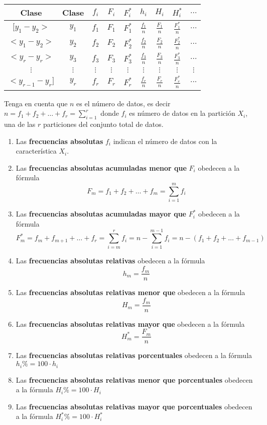 \documentclass[10pt,]{krantz}
\theoremstyle{definition}
\theoremstyle{definition}
\theoremstyle{definition}
\theoremstyle{remark}
\begin{document}
\begin{longtable}[]{@{}ccccccccc@{}}
\toprule
Clase & Clase & \(f_i\) & \(F_i\) & \(F_i^*\) & \(h_i\) & \(H_i\) & \(H_i^*\) & \(\ldots\)\tabularnewline
\midrule
\endhead
\([y_1-y_2>\) & \(y_1\) & \(f_1\) & \(F_1\) & \(F_1^*\) & \(\frac{f_1}{n}\) & \(\frac{F_1}{n}\) & \(\frac{F_1^*}{n}\) & \(\ldots\)\tabularnewline
\(<y_1-y_2>\) & \(y_2\) & \(f_2\) & \(F_2\) & \(F_2^*\) & \(\frac{f_2}{n}\) & \(\frac{F_2}{n}\) & \(\frac{F_2^*}{n}\) & \(\ldots\)\tabularnewline
\(<y_{r}-y_r>\) & \(y_3\) & \(f_3\) & \(F_3\) & \(F_3^*\) & \(\frac{f_3}{n}\) & \(\frac{F_3}{n}\) & \(\frac{F_3^*}{n}\) & \(\ldots\)\tabularnewline
\(\vdots\) & \(\vdots\) & \(\vdots\) & \(\vdots\) & \(\vdots\) & \(\vdots\) & \(\vdots\) & \(\vdots\) & \(\vdots\)\tabularnewline
\(<y_{r-1}-y_r]\) & \(y_r\) & \(f_r\) & \(F_r\) & \(F_r^*\) & \(\frac{f_r}{n}\) & \(\frac{F_r}{n}\) & \(\frac{F_r^*}{n}\) & \(...\)\tabularnewline
\bottomrule
\end{longtable}

Tenga en cuenta que \(n\) es el número de datos, es decir \(n=f_1+f_2+\ldots+f_r=\sum_{i=1}^r\) donde \(f_i\) es número de datos en la partición \(X_i\), una de las \(r\) particiones del conjunto total de datos.

\begin{enumerate}
\def\labelenumi{\arabic{enumi}.}
\item
  Las \textbf{frecuencias absolutas} \(f_i\) indican el número de datos con la característica \(X_i\).
\item
  Las \textbf{frecuencias absolutas acumuladas menor que} \(F_i\) obedecen a la fórmula
  \[F_m=f_1+f_2+\ldots+f_m=\sum_{i=1}^mf_i\]
\item
  Las \textbf{frecuencias absolutas acumuladas mayor que} \(F_i^*\) obedecen a la fórmula
  \[F_m^*=f_m+f_{m+1}+\ldots+f_r=\sum_{i=m}^rf_i=n-\sum_{i=1}^{m-1}f_i=n-\left(f_1+f_{2}+\ldots+f_{m-1}\right)\]
\item
  Las \textbf{frecuencias absolutas relativas} obedecen a la fórmula
  \[h_m=\frac{f_m}{n}\]
\item
  Las \textbf{frecuencias absolutas relativas menor que} obedecen a la fórmula
  \[H_m=\frac{f_m}{n}\]
\item
  Las \textbf{frecuencias absolutas relativas mayor que} obedecen a la fórmula
  \[H_m^*=\frac{F_m}{n}\]
\item
  Las \textbf{frecuencias absolutas relativas porcentuales} obedecen a la fórmula
  \(h_i\%=100\cdot h_i\)
\item
  Las \textbf{frecuencias absolutas relativas menor que porcentuales} obedecen a la fórmula
  \(H_i\%=100\cdot H_i\)
\item
  Las \textbf{frecuencias absolutas relativas mayor que porcentuales} obedecen a la fórmula
  \(H_i^*\%=100\cdot H_i^*\)
\end{enumerate}
\end{document}

